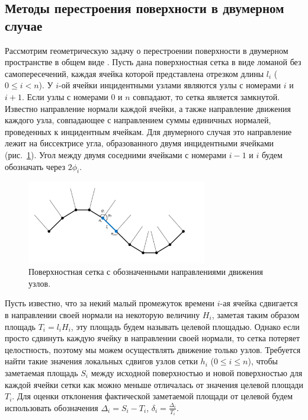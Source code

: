 \subsection{Методы перестроения поверхности в двумерном \\ случае}

Рассмотрим геометрическую задачу о перестроении поверхности в двумерном пространстве в общем виде \cite{Rybakov2019Geo2D}.
Пусть дана поверхностная сетка в виде ломаной без самопересечений, каждая ячейка которой представлена отрезком длины $l_i$ ($0 \le i < n$).
У $i$-ой ячейки инцидентными узлами являются узлы с номерами $i$ и $i + 1$.
Если узлы с номерами $0$ и $n$ совпадают, то сетка является замкнутой.
Известно направление нормали каждой ячейки, а также направление движения каждого узла, совпадающее с направлением суммы единичных нормалей, проведенных к инцидентным ячейкам.
Для двумерного случая это направление лежит на биссектрисе угла, образованного двумя инцидентными ячейками \cite{Fortin2004Remesh2d} (рис.~\ref{fig:text_1_remesh_2d_grid_normals}).
Угол между двумя соседними ячейками с номерами $i - 1$ и $i$ будем обозначать через $2 \phi_i$.

\begin{figure}[ht]
\centering
\includegraphics[width=0.7\textwidth]{pics/text_1_remesh_2d/grid_normals.pdf}
\singlespacing
{}\caption{Поверхностная сетка с обозначенными направлениями движения узлов.}
\label{fig:text_1_remesh_2d_grid_normals}
\end{figure}

Пусть известно, что за некий малый промежуток времени $i$-ая ячейка сдвигается в направлении своей нормали на некоторую величину $H_i$, заметая таким образом площадь $T_i = l_i H_i$, эту площадь будем называть целевой площадью.
Однако если просто сдвинуть каждую ячейку в направлении своей нормали, то сетка потеряет целостность, поэтому мы можем осуществлять движение только узлов.
Требуется найти такие значения локальных сдвигов узлов сетки $h_i$ ($0 \le i \le n$), чтобы заметаемая площадь $S_i$ между исходной поверхностью и новой поверхностью для каждой ячейки сетки как можно меньше отличалась от значения целевой площади $T_i$.
Для оценки отклонения фактической заметаемой площади от целевой будем использовать обозначения $\Delta_i = S_i - T_i$, $\delta_i = \frac{\Delta_i}{T_i}$.

